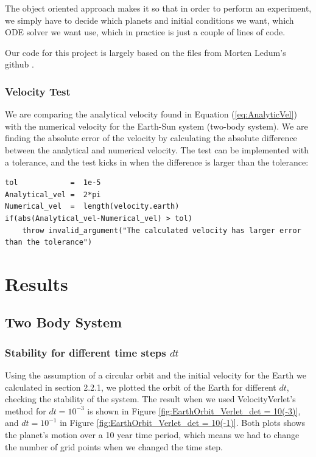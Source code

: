 \documentclass[norsk,a4paper,12pt]{article}
\begin{document}
{The object oriented approach makes it so that in order to perform an experiment, we simply have to decide which planets and initial conditions we want, which ODE solver we want use, which in practice is just a couple of lines of code.

Our code for this project is largely based on the files from Morten Ledum's github \cite{solar-system-fys3150}.
\subsubsection{Velocity Test}
We are comparing the analytical velocity found in Equation ({\ref{eq:AnalyticVel}}) with the numerical velocity for the Earth-Sun system (two-body system). We are finding the absolute error of the velocity by calculating the absolute difference between the analytical and numerical velocity. The test can be implemented with a tolerance, and the test kicks in when the difference is larger than the tolerance:
\begin{lstlisting}
tol            =  1e-5
Analytical_vel =  2*pi
Numerical_vel  =  length(velocity.earth)
if(abs(Analytical_vel-Numerical_vel) > tol)
    throw invalid_argument("The calculated velocity has larger error than the tolerance")
\end{lstlisting}

\section{Results}
\subsection{Two Body System}
\subsubsection{Stability for different time steps $dt$}

Using the assumption of a circular orbit and the initial velocity for the Earth we calculated in section 2.2.1, we plotted the orbit of the Earth for different $dt$, checking the stability of the system. The result when we used VelocityVerlet's method for $dt = 10^{-3}$ is shown in Figure \ref{fig:EarthOrbit_Verlet_det = 10(-3)}, and $dt = 10^{-1}$ in Figure \ref{fig:EarthOrbit_Verlet_det = 10(-1)}. Both plots shows the planet's motion over a 10 year time period, which means we had to change the number of grid points when we changed the time step.
\par 
\vspace{3mm}

}
\end{document}
